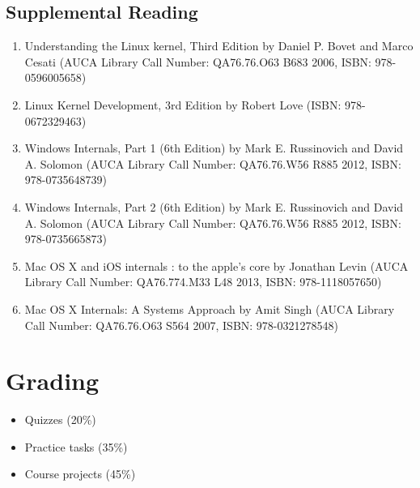 \documentclass[12pt,a4paper,oneside]{article}
\begin{document}
        \subsection{Supplemental Reading}
            \begin{enumerate}
                \item Understanding the Linux kernel, Third Edition by Daniel P.
                Bovet and Marco Cesati (AUCA Library Call Number: QA76.76.O63
                B683 2006, ISBN: 978-0596005658)
                \item Linux Kernel Development, 3rd Edition by Robert Love
                (ISBN: 978-0672329463)
                \item Windows Internals, Part 1 (6th Edition) by Mark E.
                Russinovich and David A. Solomon (AUCA Library Call Number:
                QA76.76.W56 R885 2012, ISBN: 978-0735648739)
                \item Windows Internals, Part 2 (6th Edition) by Mark E.
                Russinovich and David A. Solomon (AUCA Library Call Number:
                QA76.76.W56 R885 2012, ISBN: 978-0735665873)
                \item Mac OS X and iOS internals : to the apple's core by
                Jonathan Levin (AUCA Library Call Number: QA76.774.M33 L48 2013,
                ISBN: 978-1118057650)
                \item Mac OS X Internals: A Systems Approach by Amit Singh (AUCA
                Library Call Number: QA76.76.O63 S564 2007, ISBN:
                978-0321278548)
            \end{enumerate}

    \section{Grading}

        \begin{itemize}
            \item Quizzes (20\%)
            \item Practice tasks (35\%)
            \item Course projects (45\%)
        \end{itemize}
\end{document}

